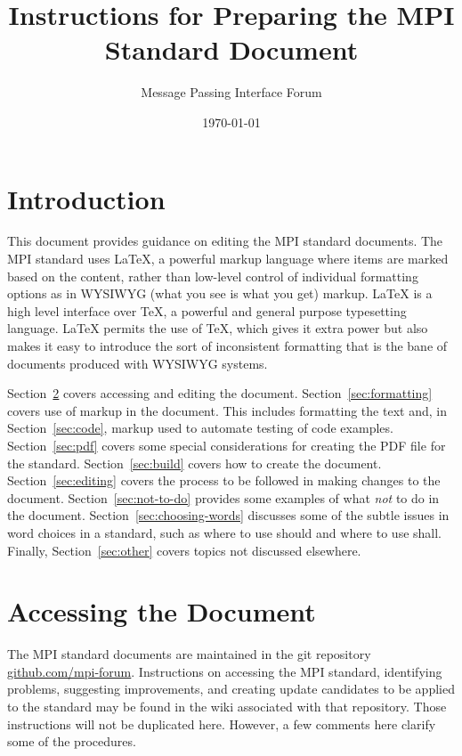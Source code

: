 \documentclass[letterpaper,twoside,11pt,fleqn]{article}
\def\MPI/{\textsf{MPI}}    %
\begin{document}
\setlength{\pdfpageheight}{\paperheight}
\setlength{\pdfpagewidth}{\paperwidth}


\title{Instructions for Preparing the \texorpdfstring{\MPI/}{MPI}
  Standard Document}

\author{Message Passing Interface Forum}

\date{\today}
\maketitle

\section{Introduction}
This document provides guidance on editing the \MPI/ standard
documents.  The \MPI/ standard uses LaTeX, a powerful markup language
where items are marked based on the content, rather than low-level
control of individual formatting options as in WYSIWYG (what you see
is what you get) markup.  LaTeX is a high level interface over TeX, a
powerful and general purpose typesetting language.  LaTeX permits the
use of TeX, which gives it extra power but also makes it easy to
introduce the sort of inconsistent formatting that is the bane of
documents produced with WYSIWYG systems.

Section~\ref{sec:access} covers accessing and editing the document.
Section~\ref{sec:formatting} covers use of markup in the document.
This includes formatting the text and, in Section~\ref{sec:code},
markup used to automate testing of code examples.
Section~\ref{sec:pdf} covers some special considerations for creating
the PDF file for the standard.
Section~\ref{sec:build} covers how to create the document.
Section~\ref{sec:editing} covers the process to be followed in making
changes to the document.
Section~\ref{sec:not-to-do} provides some examples of what \emph{not}
to do in the document.
Section~\ref{sec:choosing-words} discusses some of the subtle issues in
word choices in a standard, such as where to use should and where to
use shall.
Finally, Section~\ref{sec:other} covers topics not discussed elsewhere.

\section{Accessing the Document}
\label{sec:access}

The \MPI/ standard documents are maintained in the git repository
\url{github.com/mpi-forum}.
Instructions on accessing the \MPI/ standard, identifying problems,
suggesting improvements, and creating update candidates to be applied
to the standard may be found in the wiki associated with that
repository.
Those instructions will not be duplicated here.  However, a few
comments here clarify some of the procedures.
\end{document}
